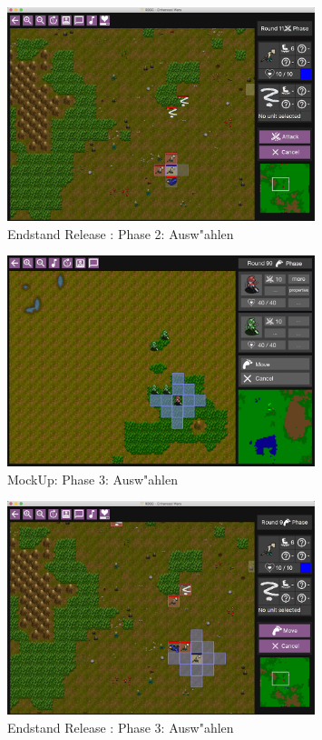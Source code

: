 \documentclass[12pt, titlepage]{scrartcl}
\newcommand{\RN}[1]{%
	\textup{\uppercase\expandafter{\romannumeral#1}}%
}
\begin{document}
				\begin{figure}[H] 
					\centering
					\includegraphics[width=0.8\textwidth]{images/endOfRelease/Select3.png}
					\caption{Endstand Release \RN{3}: Phase 2: Ausw"ahlen}
					\label{End_Select_2}
				\end{figure} 
				\begin{figure}[H] 
					\centering
					\includegraphics[width=0.8\textwidth]{images/mockUps/Select2.png}
					\caption{MockUp: Phase 3: Ausw"ahlen}
					\label{Select_3_2}
				\end{figure} 
				\begin{figure}[H] 
					\centering
					\includegraphics[width=0.8\textwidth]{images/endOfRelease/Select2.png}
					\caption{Endstand Release \RN{3}: Phase 3: Ausw"ahlen}
					\label{End_Select_3_2}
				\end{figure} 
\end{document}
